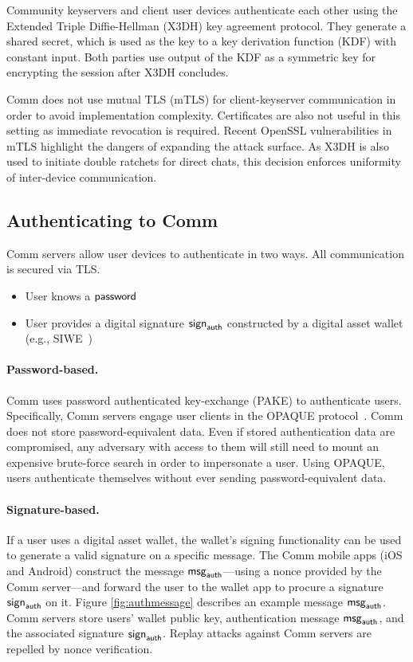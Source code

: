 \documentclass{article}
\newcommand{\pw}{{\sf password}}
\newcommand{\signauth}{{\sf sign}_{\sf auth}}
\newcommand{\msgauth}{{\sf msg}_{\sf auth}}
\begin{document}
Community keyservers and client user devices authenticate each other using the Extended Triple Diffie-Hellman (X3DH) key agreement protocol. They generate a shared secret, which is used as the key to a key derivation function (KDF) with constant input. Both parties use output of the KDF as a symmetric key for encrypting the session after X3DH concludes.

Comm does not use mutual TLS (mTLS) for client-keyserver communication in order to avoid implementation complexity. Certificates are also not useful in this setting as immediate revocation is required. Recent OpenSSL vulnerabilities in mTLS highlight the dangers of expanding the attack surface. As X3DH is also used to initiate double ratchets for direct chats, this decision enforces uniformity of inter-device communication. 

\subsection{Authenticating to Comm}
\label{sec:authenticationcomm}

Comm servers allow user devices to authenticate in two ways. All communication is secured via TLS.

\begin{itemize}
    \item User knows a $\pw$
    \item User provides a digital signature $\signauth$ constructed by a digital asset wallet (e.g., SIWE~\cite{siwe})
\end{itemize}

\paragraph{Password-based.} Comm uses password authenticated key-exchange (PAKE) to authenticate users. Specifically, Comm servers engage user clients in the OPAQUE protocol~\cite{opaque2018}. Comm does not store password-equivalent data. Even if stored authentication data are compromised, any adversary with access to them will still need to mount an expensive brute-force search in order to impersonate a user. Using OPAQUE, users authenticate themselves without ever sending password-equivalent data.

\paragraph{Signature-based.} If a user uses a digital asset wallet, the wallet's signing functionality can be used to generate a valid signature on a specific message. The Comm mobile apps (iOS and Android) construct the message $\msgauth$---using a nonce provided by the Comm server---and forward the user to the wallet app to procure a signature $\signauth$ on it. Figure \ref{fig:authmessage} describes an example message $\msgauth$. Comm servers store users' wallet public key, authentication message $\msgauth$, and the associated signature $\signauth$. Replay attacks against Comm servers are repelled by nonce verification.
\end{document}
